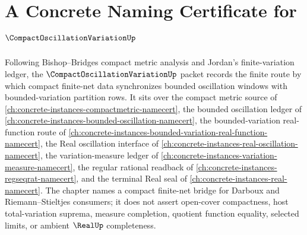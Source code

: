 \chapter{A Concrete Naming Certificate for $\CompactOscillationVariationUp$}
\label{ch:concrete-instances-compact-oscillation-variation-namecert}

Following Bishop--Bridges compact metric analysis and Jordan's finite-variation ledger, the $\CompactOscillationVariationUp$ packet records the finite route by which compact finite-net data synchronizes bounded oscillation windows with bounded-variation partition rows. It sits over the compact metric source of \autoref{ch:concrete-instances-compactmetric-namecert}, the bounded oscillation ledger of \autoref{ch:concrete-instances-bounded-oscillation-namecert}, the bounded-variation real-function route of \autoref{ch:concrete-instances-bounded-variation-real-function-namecert}, the Real oscillation interface of \autoref{ch:concrete-instances-real-oscillation-namecert}, the variation-measure ledger of \autoref{ch:concrete-instances-variation-measure-namecert}, the regular rational readback of \autoref{ch:concrete-instances-regseqrat-namecert}, and the terminal Real seal of \autoref{ch:concrete-instances-real-namecert}. The chapter names a compact finite-net bridge for Darboux and Riemann--Stieltjes consumers; it does not assert open-cover compactness, host total-variation suprema, measure completion, quotient function equality, selected limits, or ambient $\RealUp$ completeness.

